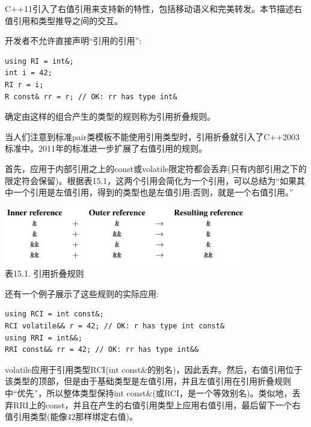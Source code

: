 
C++11引入了右值引用来支持新的特性，包括移动语义和完美转发。本节描述右值引用和类型推导之间的交互。


开发者不允许直接声明“引用的引用”:

\begin{lstlisting}[style=styleCXX]
using RI = int&;
int i = 42;
RI r = i;
R const& rr = r; // OK: rr has type int&
\end{lstlisting}

确定由这样的组合产生的类型的规则称为引用折叠规则。

\begin{tcolorbox}[colback=webgreen!5!white,colframe=webgreen!75!black]
\hspace*{0.75cm}当人们注意到标准pair类模板不能使用引用类型时，引用折叠就引入了C++2003标准中。2011年的标准进一步扩展了右值引用的规则。
\end{tcolorbox}

首先，应用于内部引用之上的const或volatile限定符都会丢弃(只有内部引用之下的限定符会保留)。根据表15.1，这两个引用会简化为一个引用，可以总结为“如果其中一个引用是左值引用，得到的类型也是左值引用;否则，就是一个右值引用。”

\begin{center}
\includegraphics[width=0.8\textwidth]{content/2/chapter15/images/1.png} \\
表15.1. 引用折叠规则
\end{center}

还有一个例子展示了这些规则的实际应用:

\begin{lstlisting}[style=styleCXX]
using RCI = int const&;
RCI volatile&& r = 42; // OK: r has type int const&
using RRI = int&&;
RRI const&& rr = 42; // OK: rr has type int&&
\end{lstlisting}

volatile应用于引用类型RCI(int const\&的别名)，因此丢弃。然后，右值引用位于该类型的顶部，但是由于基础类型是左值引用，并且左值引用在引用折叠规则中“优先”，所以整体类型保持int const\&(或RCI，是一个等效别名)。类似地，丢弃RRI上的const，并且在产生的右值引用类型上应用右值引用，最后留下一个右值引用类型(能像42那样绑定右值)。

